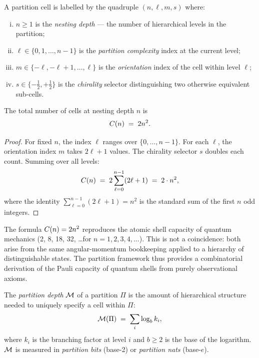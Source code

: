 \begin{definition}
\label{def:partition-coords}
A partition cell is labelled by the quadruple $(n, \ell, m, s)$ where:
\begin{enumerate}[(i)]
  \item $n \geq 1$ is the \emph{nesting depth} — the number of hierarchical
    levels in the partition;
  \item $\ell \in \{0, 1, \ldots, n-1\}$ is the \emph{partition complexity}
    index at the current level;
  \item $m \in \{-\ell, -\ell+1, \ldots, \ell\}$ is the \emph{orientation}
    index of the cell within level $\ell$;
  \item $s \in \{-\tfrac{1}{2}, +\tfrac{1}{2}\}$ is the \emph{chirality}
    selector distinguishing two otherwise equivalent sub-cells.
\end{enumerate}
\end{definition}

\begin{proposition}
\label{prop:capacity}
The total number of cells at nesting depth $n$ is
\[
  C(n) \;=\; 2n^2 .
\]
\end{proposition}

\begin{proof}
For fixed $n$, the index $\ell$ ranges over $\{0, \ldots, n-1\}$.  For each
$\ell$, the orientation index $m$ takes $2\ell + 1$ values.  The chirality
selector $s$ doubles each count.  Summing over all levels:
\[
  C(n) \;=\; 2 \sum_{\ell=0}^{n-1} (2\ell + 1)
  \;=\; 2 \cdot n^2 ,
\]
where the identity $\sum_{\ell=0}^{n-1}(2\ell+1) = n^2$ is the standard sum
of the first $n$ odd integers.
\end{proof}

\begin{remark}
The formula $C(n) = 2n^2$ reproduces the atomic shell capacity of
quantum mechanics (2, 8, 18, 32, \ldots for $n = 1, 2, 3, 4, \ldots$).  This
is not a coincidence: both arise from the same angular-momentum bookkeeping
applied to a hierarchy of distinguishable states.  The partition framework thus
provides a combinatorial derivation of the Pauli capacity of quantum shells
from purely observational axioms.
\end{remark}

\begin{definition}
\label{def:partition-depth}
The \emph{partition depth} $\mathcal{M}$ of a partition $\Pi$ is the amount of
hierarchical structure needed to uniquely specify a cell within $\Pi$:
\[
  \mathcal{M}(\Pi) \;=\; \sum_{i} \log_b k_i ,
\]
where $k_i$ is the branching factor at level $i$ and $b \geq 2$ is the base
of the logarithm.  $\mathcal{M}$ is measured in \emph{partition bits} (base-2)
or \emph{partition nats} (base-$e$).
\end{definition}

